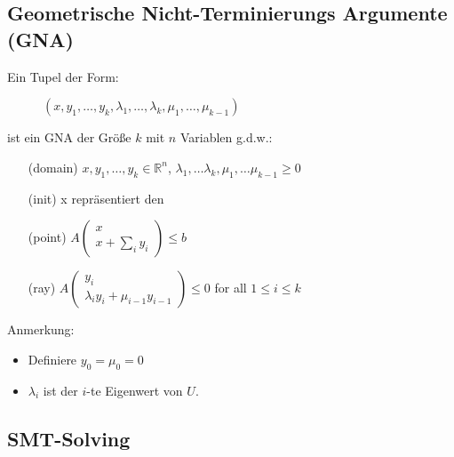\subsection{Geometrische Nicht-Terminierungs Argumente (GNA)}
\begin{frame}
	\begin{definition}
		\label{def:gna}
		Ein Tupel der Form:
		\vspace{-1em}
		\begin{figure}
			\centering
			$(x, y_1, \dots, y_k, \lambda_1, \dots, \lambda_k, \mu_1, \dots, \mu_{k-1})$
		\end{figure}  
		\vspace{-1em}
		ist ein GNA der Gr\"o\ss e $k$ mit $n$ Variablen g.d.w.:
		\begin{itemize}
			\setlength{\itemindent}{1in}
			\item[(domain)] $x, y_1, \dots, y_k \in \mathbb{R}^n$, $\lambda_1, \dots \lambda_k, \mu_1, \dots \mu_{k-1} \ge 0$
			\item[(init)] x repr\"asentiert den \stem
			\item[(point)] $A\begin{pmatrix} x \\ x + \sum_i y_i \end{pmatrix} \le b$
			\item[(ray)] $A\begin{pmatrix} y_i \\ \lambda_i y_i + \mu_{i-1} y_{i-1} \end{pmatrix} \le 0$ for all $1 \le i \le k$
		\end{itemize}
		Anmerkung:
		\begin{itemize}
			\item Definiere $y_0 = \mu_0 = 0$
			\item $\lambda_i$ ist der $i$-te Eigenwert von $U$.
		\end{itemize}
	\end{definition}
\end{frame}

\subsection{SMT-Solving}

